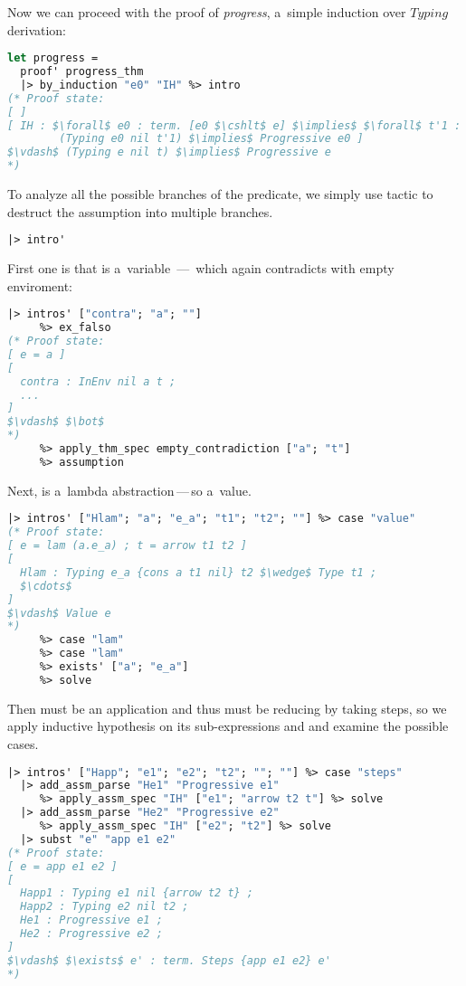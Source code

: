 \documentclass[english, mgr]{iithesis}
\newcommand{\lstt}[1]{\text{{\lstinline[columns=fixed,mathescape]|#1|}}}
\renewcommand{\it}[1]{\textit{#1}}
\newcommand{\mdash}{\,---\,}
\def\-{{\mdash}}
\begin{document}
Now we can proceed with the proof of \it{progress}, a~simple induction over $Typing$ derivation:
\begin{lstlisting}[mathescape,language=OCaml,escapebegin=\color{codegreen}]
let progress =
  proof' progress_thm
  |> by_induction "e0" "IH" %> intro
(* Proof state:
[ ]
[ IH : $\forall$ e0 : term. [e0 $\cshlt$ e] $\implies$ $\forall$ t'1 : term.
        (Typing e0 nil t'1) $\implies$ Progressive e0 ]
$\vdash$ (Typing e nil t) $\implies$ Progressive e
*)
\end{lstlisting}
To analyze all the possible branches of the \lstt{Typing} predicate,
we simply use \lstt{intro'} tactic to destruct the assumption into multiple branches.
\begin{lstlisting}[language=OCaml]
  |> intro'
\end{lstlisting}
First one is that \lstt{e} is a~variable \- which again contradicts with empty enviroment:
\begin{lstlisting}[mathescape,language=OCaml,escapebegin=\color{codegreen}]
  |> intros' ["contra"; "a"; ""]
     %> ex_falso
(* Proof state:
[ e = a ]
[
  contra : InEnv nil a t ;
  ...
]
$\vdash$ $\bot$
*)
     %> apply_thm_spec empty_contradiction ["a"; "t"]
     %> assumption
\end{lstlisting}
Next, \lstt{e} is a~lambda abstraction\-so a~value.
\begin{lstlisting}[mathescape,language=OCaml,escapebegin=\color{codegreen}]
  |> intros' ["Hlam"; "a"; "e_a"; "t1"; "t2"; ""] %> case "value"
(* Proof state:
[ e = lam (a.e_a) ; t = arrow t1 t2 ]
[
  Hlam : Typing e_a {cons a t1 nil} t2 $\wedge$ Type t1 ;
  $\cdots$
]
$\vdash$ Value e
*)
     %> case "lam"
     %> case "lam"
     %> exists' ["a"; "e_a"]
     %> solve
\end{lstlisting}
Then \lstt{e} must be an application and thus must be reducing by taking steps,
so we apply inductive hypothesis on its sub-expressions \lstt{e1} and \lstt{e2}
and examine the possible cases.
\begin{lstlisting}[mathescape,language=OCaml,escapebegin=\color{codegreen}]
  |> intros' ["Happ"; "e1"; "e2"; "t2"; ""; ""] %> case "steps"
  |> add_assm_parse "He1" "Progressive e1"
     %> apply_assm_spec "IH" ["e1"; "arrow t2 t"] %> solve
  |> add_assm_parse "He2" "Progressive e2"
     %> apply_assm_spec "IH" ["e2"; "t2"] %> solve
  |> subst "e" "app e1 e2"
(* Proof state:
[ e = app e1 e2 ]
[
  Happ1 : Typing e1 nil {arrow t2 t} ;
  Happ2 : Typing e2 nil t2 ;
  He1 : Progressive e1 ;
  He2 : Progressive e2 ;
]
$\vdash$ $\exists$ e' : term. Steps {app e1 e2} e'
*)
\end{lstlisting}
\end{document}
